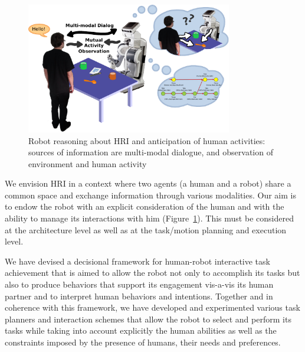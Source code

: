 \documentclass{svmult}
\begin{document}
\begin{figure}[htb]
\centering
\includegraphics[width=9cm]{figs/grounding_robot.pdf}
\caption{Robot reasoning about HRI and anticipation of human activities:
  sources of information are multi-modal dialogue, and observation of
  environment and human activity}
\label{fig:hri-dec}
\end{figure}

We envision HRI in a context where two agents (a human and a robot)
share a common space and exchange information through various
modalities. Our aim is to endow the robot with an explicit
consideration of the human and with the ability to manage its
interactions with him (Figure~\ref{fig:hri-dec}). This must be
considered at the architecture level as well as at the task/motion
planning and execution level. 

We have devised a decisional framework for human-robot interactive
task achievement that is aimed to allow the robot not only to
accomplish its tasks but also to produce behaviors that support its
engagement vis-a-vis its human partner and to interpret human
behaviors and intentions. 
Together and in coherence with this framework, we have developed
and experimented various task planners and interaction schemes that
allow the robot to select and perform its tasks while taking into
account explicitly the human abilities as well as the constraints
imposed by the presence of humans, their needs and preferences. 



\end{document}
